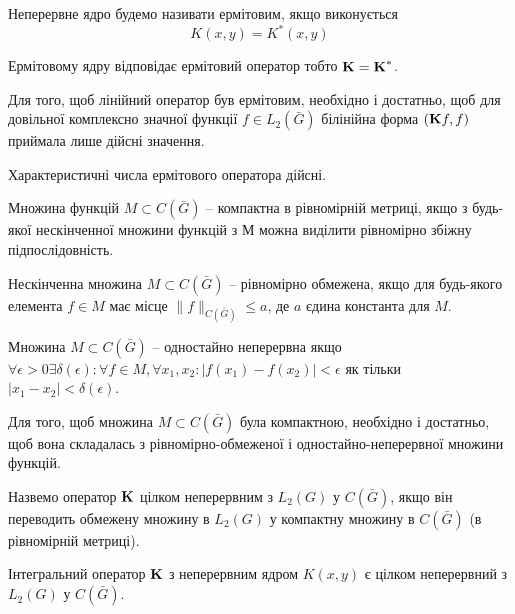 Неперервне ядро будемо називати ермітовим, якщо виконується
\begin{equation}
	\label{eq:3.1}
	K(x, y) = K^*(x, y)
\end{equation}

Ермітовому ядру відповідає ермітовий оператор тобто $\bf{K} = \bf{K}^*$.

\begin{lemma}
	Для того, щоб лінійний оператор був ермітовим, необхідно і достатньо, щоб для довільної комплексно значної функції $f \in L_2(\bar G)$ білінійна форма $(\bf{K}f, f)$ приймала лише дійсні значення.
\end{lemma}
\begin{lemma}
	Характеристичні числа ермітового оператора дійсні.
\end{lemma}
\begin{definition}
	Множина функцій $M \subset C(\bar G)$ -- компактна в рівномірній метриці, якщо з будь-якої нескінченної множини функцій з $М$ можна виділити рівномірно збіжну підпослідовність.
\end{definition}
\begin{definition}
	Нескінченна множина $M \subset C(\bar G)$ -- рівномірно обмежена, якщо для будь-якого елемента $f \in M$ має місце $\|f\|_{C(\bar G)} \le a$, де $a$ єдина константа для $M$.
\end{definition}
\begin{definition}
	Множина $M \subset C(\bar G)$ -- одностайно неперервна якщо $\forall \epsilon > 0 \exists \delta(\epsilon): \forall f \in M, \forall x_1, x_2: |f(x_1) - f(x_2)| < \epsilon$ як тільки $|x_1 - x_2| < \delta(\epsilon)$.
\end{definition}
\begin{theorem}
	Для того, щоб множина $M \subset C(\bar G)$ була компактною, необхідно і достатньо, щоб вона складалась з рівномірно-обмеженої і одностайно-неперервної множини функцій.
\end{theorem}
\begin{definition}
	Назвемо оператор $\bf{K}$ цілком неперервним з $L_2(G)$ у $C(\bar G)$, якщо він переводить обмежену множину в $L_2(G)$ у компактну множину в $C(\bar G)$ (в рівномірній метриці).
\end{definition}
\begin{lemma}
	Інтегральний оператор $\bf{K}$ з неперервним ядром $K(x, y)$ є цілком неперервний з $L_2(G)$ у $C(\bar G)$.
\end{lemma}
